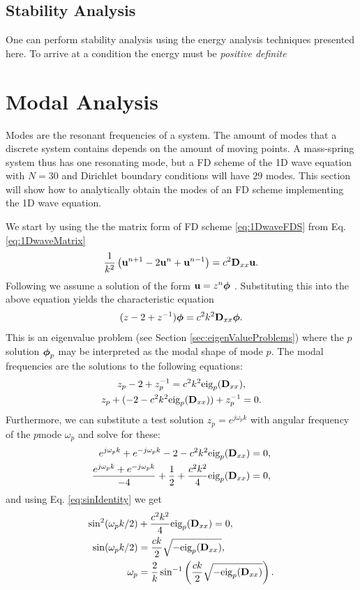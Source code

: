{{\subsection{Stability Analysis}
One can perform stability analysis using the energy analysis techniques presented here. To arrive at a condition the energy must be \textit{positive definite} 

\section{Modal Analysis}
\label{sec:modalAnalysis}
Modes are the resonant frequencies of a system. The amount of modes that a discrete system contains depends on the amount of moving points. A mass-spring system thus has one resonating mode, but a FD scheme of the 1D wave equation with $N = 30$ and Dirichlet boundary conditions will have $29$ modes. This section will show how to analytically obtain the modes of an FD scheme implementing the 1D wave equation. 

We start by using the the matrix form of FD scheme \eqref{eq:1DwaveFDS} from Eq. \eqref{eq:1DwaveMatrix}
\begin{equation*}
    \frac{1}{k^2}\left(\mathbf{u}^{n+1}-2\mathbf{u}^n+\mathbf{u}^{n-1}\right) = c^2 \mathbf{D}_{xx}\mathbf{u}.
\end{equation*}
Following \cite{theBible} we assume a solution of the form $\mathbf{u} = z^n\boldsymbol{\phi}$ . Substituting this into the above equation yields the characteristic equation
\begin{equation}
    (z - 2 + z^{-1})\boldsymbol{\phi} = c^2k^2\mathbf{D}_{xx} \boldsymbol{\phi}.
\end{equation}
This is an eigenvalue problem (see Section \ref{sec:eigenValueProblems}) where the $p$\th solution $\boldsymbol{\phi}_p$ may be interpreted as the modal shape of mode $p$. The modal frequencies are the solutions to the following equations:
\begin{gather}
    z_p-2+z_p^{-1} = c^2k^2\text{eig}_p(\mathbf{D}_{xx}),\nonumber\\
    z_p+(-2-c^2k^2\text{eig}_p(\mathbf{D}_{xx}))+z_p^{-1}=0.
\end{gather}
 Furthermore, we can substitute a test solution $z_p=e^{j\omega_pk}$ with angular frequency of the $p$\th mode $\omega_p$ and solve for these:
\begin{align*}
    e^{j\omega_pk}+e^{-j\omega_pk}-2-c^2k^2\text{eig}_p(\mathbf{D}_{xx})&=0,\\
    \frac{e^{j\omega_pk}+e^{-j\omega_pk}}{-4}+\frac{1}{2}+\frac{c^2k^2}{4}\text{eig}_p(\mathbf{D}_{xx})&=0,
\end{align*}
and using Eq. \eqref{eq:sinIdentity} we get
\begin{align}
    \sin^2(\omega_pk/2)&+\frac{c^2k^2}{4}\text{eig}_p(\mathbf{D}_{xx})=0,\nonumber\\
    \sin(\omega_pk/2)&=\frac{ck}{2}\sqrt{-\text{eig}_p(\mathbf{D}_{xx})},\nonumber\\
    \omega_p &= \frac{2}{k}\sin^{-1}\left(\frac{ck}{2}\sqrt{-\text{eig}_p(\mathbf{D}_{xx})}\right).
\end{align}

}}

